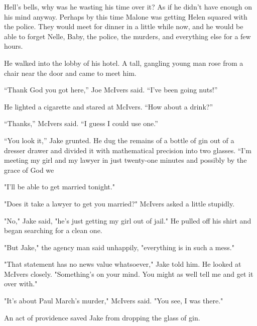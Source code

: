 \documentclass{novel}
\begin{document}
Hell’s bells, why was he wasting his time over it? As if he didn’t have enough on his mind anyway. Perhaps by this time Malone was getting Helen squared with the police. They would meet for dinner in a little while now, and he would be able to forget Nelle, Baby, the police, the murders, and everything else for a few hours.

He walked into the lobby of his hotel. A tall, gangling young man rose from a chair near the door and came to meet him.

“Thank God you got here,” Joe McIvers said. “I’ve been going nuts!”

\begin{ChapterStart}
\vspace{3\nbs}
\end{ChapterStart}

He lighted a cigarette and stared at McIvers. “How about a drink?”

“Thanks,” McIvers said. “I guess I could use one.”

“You look it,” Jake grunted. He dug the remains of a bottle of gin out of a dresser drawer and divided it with mathematical precision into two glasses. “I’m meeting my girl and my lawyer in just twenty-one minutes and possibly by the grace of God we

"I'll be able to get married tonight."

"Does it take a lawyer to get you married?" McIvers asked a little stupidly.

"No," Jake said, "he's just getting my girl out of jail." He pulled off his shirt and began searching for a clean one.

"But Jake," the agency man said unhappily, "everything is in such a mess."

"That statement has no news value whatsoever," Jake told him. He looked at McIvers closely. "Something's on your mind. You might as well tell me and get it over with."

"It's about Paul March's murder," McIvers said. "You see, I was there."

An act of providence saved Jake from dropping the glass of gin.
\end{document}
